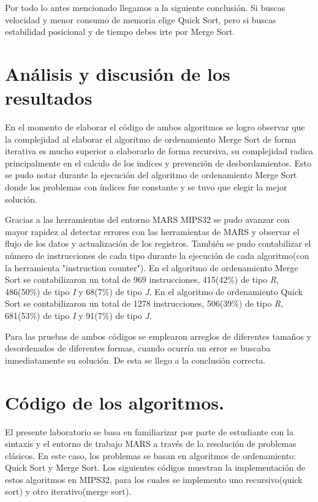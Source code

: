 \documentclass[12pt, a4paper]{article}
\begin{document}
            Por todo lo antes mencionado llegamos a la siguiente conclusión. Si buscas velocidad y menor consumo de memoria elige Quick Sort, pero si buscas estabilidad posicional y de tiempo debes irte por Merge Sort.
    \section{Análisis y discusión de los resultados}
            En el momento de elaborar el código de ambos algoritmos se logro observar que la complejidad al elaborar el algoritmo de ordenamiento Merge Sort de forma iterativa es mucho superior a elaborarlo de forma recursiva, su complejidad radica principalmente en el calculo de los indices y prevención de desbordamientos. Esto se pudo notar durante la ejecución del algoritmo de ordenamiento Merge Sort donde los problemas con índices fue constante y se tuvo que elegir la mejor solución.

            Gracias a las herramientas del entorno MARS MIPS32 se pudo avanzar con mayor rapidez al detectar errores con las herramientas de MARS y observar el flujo de los datos y actualización de los registros. También se pudo contabilizar el número de instrucciones de cada tipo durante la ejecución de cada algoritmo(con la herramienta "instruction counter"). En el algoritmo de ordenamiento Merge Sort se contabilizaron un total de 969 instrucciones, 415(42\%) de tipo \textit{R}, 486(50\%) de tipo \textit{I} y 68(7\%) de tipo \textit{J}. En el algoritmo de ordenamiento Quick Sort se contabilizaron un total de 1278 instrucciones, 506(39\%) de tipo \textit{R}, 681(53\%) de tipo \textit{I} y 91(7\%) de tipo \textit{J}.

            Para las pruebas de ambos códigos se emplearon arreglos de diferentes tamaños y desordenados de diferentes formas, cuando ocurría un error se buscaba inmediatamente su solución. De esta se llego a la conclusión correcta.
     \section{Código de los algoritmos.}
        El presente laboratorio se basa en familiarizar por parte de estudiante con la sintaxis y el entorno de trabajo MARS a través de la resolución de problemas clásicos. En este caso, los problemas se basan en algoritmos de ordenamiento: Quick Sort y Merge Sort.
        Los siguientes códigos muestran la implementación de estos algoritmos en MIPS32, para los cuales se implemento uno recursivo(quick sort) y otro iterativo(merge sort).
\end{document}
